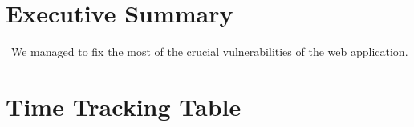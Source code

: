 \documentclass[headsepline,footsepline,footinclude=false,oneside,fontsize=11pt,paper=a4,listof=totoc,bibliography=totoc]{scrbook} %
\begin{document}


\frontmatter{}


{
	\chapter{Executive Summary}\
	We managed to fix the most of the crucial vulnerabilities of the web application.
	

}

\pagebreak
%
%
%
%
\tableofcontents{}
\mainmatter{}

\chapter{Time Tracking Table}
\end{document}

